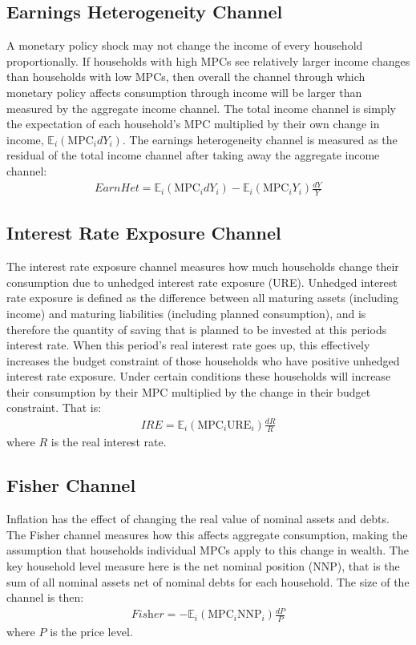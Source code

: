 \documentclass[titlepage]{\econtex}\newcommand{\texname}{ConsumptionHeterogeneity}
\begin{document}
\subsection{Earnings Heterogeneity Channel}
A monetary policy shock may not change the income of every household proportionally. If households with high MPCs see relatively larger income changes than households with low MPCs, then overall the channel through which monetary policy affects consumption through income will be larger than measured by the aggregate income channel. The total income channel is simply the expectation of each household's MPC multiplied by their own change in income, $\mathbb{E}_i \left( \text{MPC}_i dY_i  \right) $. The earnings heterogeneity channel is measured as the residual of the total income channel after taking away the aggregate income channel:
\begin{align}
\textit{EarnHet} = \mathbb{E}_i \left( \text{MPC}_i dY_i  \right) - \mathbb{E}_i \left( \text{MPC}_i Y_i  \right) \frac{dY}{Y}
\end{align}

\subsection{Interest Rate Exposure Channel}
The interest rate exposure channel measures how much households change their consumption due to unhedged interest rate exposure (URE). Unhedged interest rate exposure is defined as the difference between all maturing assets (including income) and maturing liabilities (including planned consumption), and is therefore the quantity of saving that is planned to be invested at this periods interest rate. When this period's real interest rate goes up, this effectively increases the budget constraint of those households who have positive unhedged interest rate exposure. Under certain conditions these households will increase their consumption by their MPC multiplied by the change in their budget constraint. That is:
\begin{align}
\textit{IRE} = \mathbb{E}_i \left( \text{MPC}_i \text{URE}_i  \right) \frac{dR}{R}
\end{align}
where $R$ is the real interest rate.

\subsection{Fisher Channel}
Inflation has the effect of changing the real value of nominal assets and debts. The Fisher channel measures how this affects aggregate consumption, making the assumption that households individual MPCs apply to this change in wealth. The key household level measure here is the net nominal position (NNP), that is the sum of all nominal assets net of nominal debts for each household. The size of the channel is then:
\begin{align}
\textit{Fisher} = -\mathbb{E}_i \left( \text{MPC}_i \text{NNP}_i  \right) \frac{dP}{P}
\end{align}
where $P$ is the price level.
\end{document}
